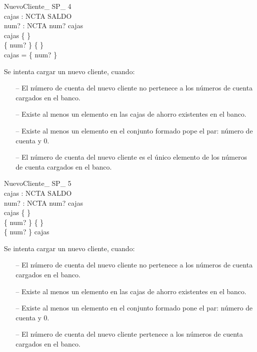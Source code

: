 \begin{schema}{NuevoCliente\_ SP\_ 4}\\
 cajas : NCTA \pfun SALDO \\
 num? : NCTA 
\where
 num? \notin \dom cajas \\
 cajas \neq \{ \} \\
 \{ num?  \} \neq \{ \} \\
 \dom cajas = \dom \{ num?  \}
\end{schema}

\begin{tcolorbox}[colback=gray!5!white,colframe=gray!50!black,
  colbacktitle=gray!75!black,title=NuevoCliente\_SP\_4]
  Se intenta cargar un nuevo cliente, cuando:
     \begin{itemize}
        \item[--]{El número de cuenta del nuevo cliente no pertenece a los números de cuenta cargados en el banco.}
        \item[--]{Existe al menos un elemento en las cajas de ahorro existentes en el banco.}
        \item[--]{Existe al menos un elemento en el conjunto formado pope el par: número de cuenta y 0.}
        \item[--]{El número de cuenta del nuevo cliente es el único elemento de los números de cuenta cargados en el banco.}
     \end{itemize}
\end{tcolorbox}


\begin{schema}{NuevoCliente\_ SP\_ 5}\\
 cajas : NCTA \pfun SALDO \\
 num? : NCTA 
\where
 num? \notin \dom cajas \\
 cajas \neq \{ \} \\
 \{ num?  \} \neq \{ \} \\
 \dom \{ num?  \} \subset \dom cajas
\end{schema}

\begin{tcolorbox}[colback=gray!5!white,colframe=gray!50!black,
  colbacktitle=gray!75!black,title=NuevoCliente\_SP\_5]
  Se intenta cargar un nuevo cliente, cuando:
     \begin{itemize}
        \item[--]{El número de cuenta del nuevo cliente no pertenece a los números de cuenta cargados en el banco.}
        \item[--]{Existe al menos un elemento en las cajas de ahorro existentes en el banco.}
        \item[--]{Existe al menos un elemento en el conjunto formado pone el par: número de cuenta y 0.}
        \item[--]{El número de cuenta del nuevo cliente pertenece a los números de cuenta cargados en el banco.}
     \end{itemize}
\end{tcolorbox}


